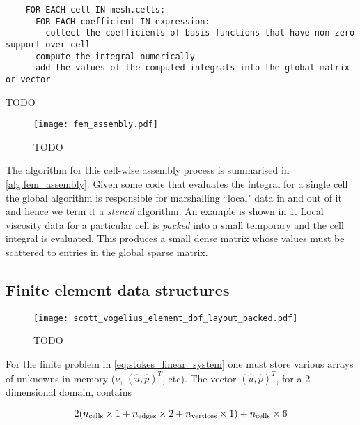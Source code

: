 \documentclass[thesis]{subfiles}
\begin{document}
\begin{algorithm}
  \begin{verbatim}
    FOR EACH cell IN mesh.cells:
      FOR EACH coefficient IN expression:
        collect the coefficients of basis functions that have non-zero support over cell
      compute the integral numerically
      add the values of the computed integrals into the global matrix or vector
  \end{verbatim}
  \caption{TODO}
  \label{alg:fem_assembly}
\end{algorithm}

\begin{figure}
  \centering
  \texttt{[image: fem\_assembly.pdf]}
  \caption{TODO}
  \label{fig:fem_assembly}
\end{figure}

The algorithm for this cell-wise assembly process is summarised in \cref{alg:fem_assembly}.
Given some code that evaluates the integral for a single cell the global algorithm is responsible for marshalling ``local" data in and out of it and hence we term it a \textit{stencil} algorithm.
An example is shown in \cref{fig:fem_assembly}.
Local viscosity data for a particular cell is \textit{packed} into a small temporary and the cell integral is evaluated.
This produces a small dense matrix whose values must be scattered to entries in the global sparse matrix.

\subsection{Finite element data structures}

\begin{figure}
  \centering
  \texttt{[image: scott\_vogelius\_element\_dof\_layout\_packed.pdf]}
  \caption{TODO}
  \label{fig:scott_vogelius_element_dof_layout_packed}
\end{figure}

For the finite problem in \cref{eq:stokes_linear_system} one must store various arrays of unknowns in memory ($\nu$, $(\hat u, \hat p)^T$, etc).
The vector $(\hat u, \hat p)^T$, for a 2-dimensional domain, contains

\begin{equation*}
  2 ( n_\textnormal{cells} \times 1 + n_\textnormal{edges} \times 2 + n_\textnormal{vertices} \times 1 ) + n_\textnormal{cells} \times 6
\end{equation*}
\end{document}
